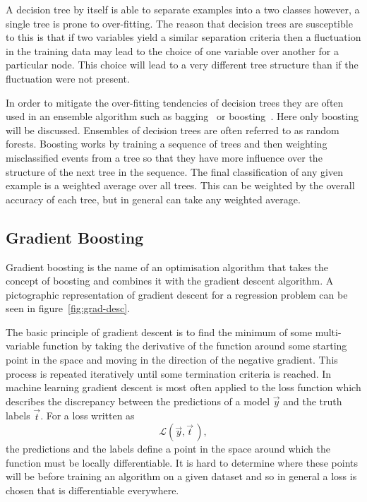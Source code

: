 A decision tree by itself is able to separate examples into a two classes
however, a single tree is prone to over-fitting.  The reason that decision trees
are susceptible to this is that if two variables yield a similar separation
criteria then a fluctuation in the training data may lead to the choice of one
variable over another for a particular node. This choice will lead to a very
different tree structure than if the fluctuation were not present.

In order to mitigate the over-fitting tendencies of decision trees they are
often used in an ensemble algorithm such as bagging~\cite{Bagging}
or boosting~\cite{Boosting}. Here only boosting will be discussed. Ensembles of
decision trees are often referred to as random forests. Boosting works by
training a sequence of trees and then weighting misclassified events from a tree
so that they have more influence over the structure of the next tree in the
sequence. The final classification of any given example is a weighted average
over all trees. This can be weighted by the overall accuracy of each tree, but
in general can take any weighted average.

\subsection{Gradient Boosting}

Gradient boosting is the name of an optimisation algorithm that takes the
concept of boosting and combines it with the gradient descent algorithm. A
pictographic representation of gradient descent for a regression problem can be
seen in figure~\ref{fig:grad-desc}.

The basic principle of gradient descent is to find the minimum of some
multi-variable function by taking the derivative of the function around some
starting point in the space and moving in the direction of the negative
gradient. This process is repeated iteratively until some termination criteria
is reached. In machine learning gradient descent is most often applied to the
loss function which describes the discrepancy between the predictions of a model
$\vec{y}$ and the truth labels $\vec{t}$. For a loss written as
\begin{equation}
  \mathcal{L}(\vec{y}, \vec{t} \,),
\end{equation}
the predictions and the labels define a point in the space around which the
function must be locally differentiable. It is hard to determine where these
points will be before training an algorithm on a given dataset and so in general
a loss is chosen that is differentiable everywhere.

